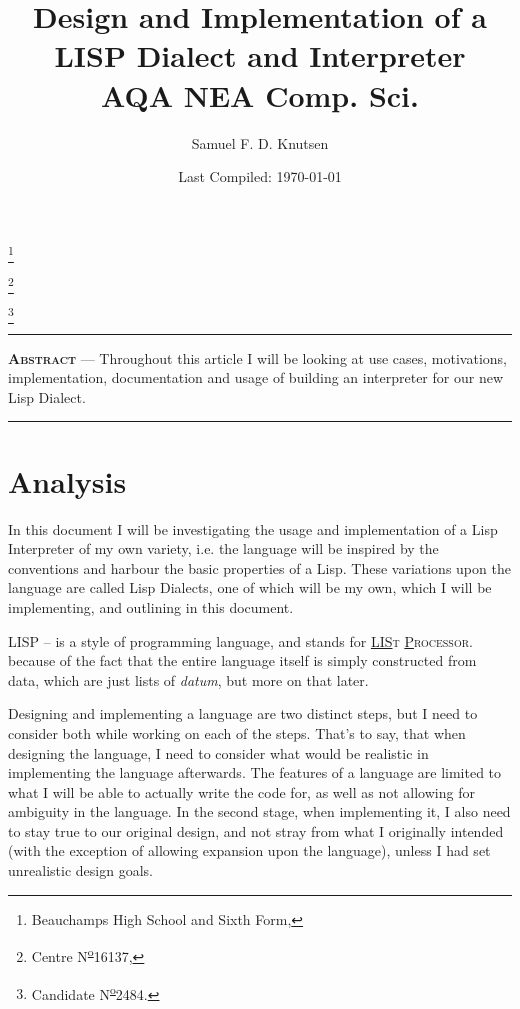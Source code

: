 \documentclass{article}
\renewenvironment{abstract}{
\begin{minipage}{0.95\textwidth}
  \rule{\textwidth}{1pt}}
  {\par\noindent\rule{\textwidth}{1pt}
\end{minipage}}
\newcommand{\super}{\textsuperscript}
\newcommand{\numero}{N\super{\underline{o}}}
\newcommand\blfootnote[1]{%
  \begingroup
  \renewcommand\thefootnote{}\footnote{#1}%
  \addtocounter{footnote}{-1}%
  \endgroup
}
\begin{document}

  \title{Design and Implementation of a\\LISP Dialect and Interpreter\\
    \medskip
    \large{\textrm{AQA NEA Comp. Sci.}}}
  \author{Samuel F. D. Knutsen}
  \date{Last Compiled: \today}
  \maketitle
  \blfootnote{Beauchamps High School and Sixth Form,}
  \blfootnote{Centre \numero 16137,}
  \blfootnote{Candidate \numero 2484.}
  \clearpage

  \tableofcontents
  \clearpage

  \setlength{\parindent}{2em}
  \setlength{\parskip}{0.75em}

  \begin{abstract}
    \textsc{\textbf{Abstract}} ---
    Throughout this article I will be looking at use cases, motivations,
    implementation, documentation and usage of building an interpreter for
    our new Lisp Dialect.
    \vspace{-5pt}
  \end{abstract}

\section{Analysis}
  In this document I will be investigating the usage and implementation of
  a Lisp Interpreter of my own variety, i.e. the language will be inspired
  by the conventions and harbour the basic properties of a Lisp. These
  variations upon the language are called Lisp Dialects, one of which will be
  my own, which I will be implementing, and outlining in this document.

  LISP -- is a style of programming language, and stands for
  \textsc{\underline{LIS}t \underline{P}rocessor}.\\
  because of the fact that the entire language itself is simply constructed from
  data, which are just lists of \emph{datum}, but more on that later.

  Designing and implementing a language are two distinct steps, but I need
  to consider both while working on each of the steps. That's to say, that
  when designing the language, I need to consider what would be realistic in
  implementing the language afterwards. The features of a language are
  limited to what I will be able to actually write the code for, as well as not
  allowing for ambiguity in the language.
  In the second stage, when implementing it, I also
  need to stay true to our original design, and not stray from what I
  originally intended (with the exception of allowing expansion upon the language),
  unless I had set unrealistic design goals.
\end{document}
